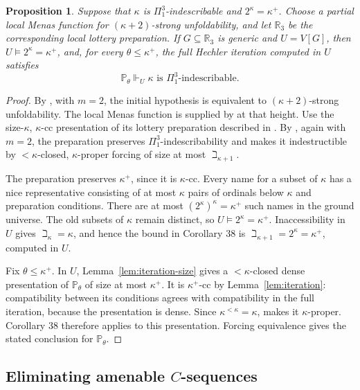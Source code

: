 \documentclass[11pt,a4paper]{amsart}
\newtheorem{proposition}[theorem]{Proposition}
\theoremstyle{definition}
\theoremstyle{remark}
\newcommand{\PP}{\mathbb P}
\newcommand{\RR}{\mathbb R}
\begin{document}
\begin{proposition}
\label{prop:pi3-preparation}
Suppose that \(\kappa\) is \(\Pi^3_1\)-indescribable and
\(2^\kappa=\kappa^+\). Choose a partial local Menas function
for \((\kappa+2)\)-strong unfoldability, and let
\(\RR_3\) be the corresponding local lottery preparation.
If \(G\subseteq\RR_3\) is generic and \(U=V[G]\), then
\(U\models2^\kappa=\kappa^+\), and, for every
\(\theta\leq\kappa^+\), the full Hechler iteration
computed in \(U\) satisfies
\[
 \PP_\theta\Vdash_U
       \text{\(\kappa\) is \(\Pi^3_1\)-indescribable}.
\]
\end{proposition}
\begin{proof}
By \cite[Corollary 35]{Johnstone}, with \(m=2\), the
initial hypothesis is equivalent to
\((\kappa+2)\)-strong unfoldability. The local Menas
function is supplied by \cite[Theorem 10(2)]{Johnstone}
at that height. Use the size-\(\kappa\), \(\kappa\)-cc
presentation of its lottery preparation described in
\cite[pp.~1229--1230]{Johnstone}.
By \cite[Corollary 38]{Johnstone}, again with \(m=2\), the preparation
preserves \(\Pi^3_1\)-indescribability and makes it
indestructible by \(<\kappa\)-closed,
\(\kappa\)-proper forcing of size at most
\(\beth_{\kappa+1}\).

The preparation preserves \(\kappa^+\), since it is
\(\kappa\)-cc. Every name for a subset of \(\kappa\)
has a nice representative consisting of at most
\(\kappa\) pairs of ordinals below \(\kappa\) and
preparation conditions. There are at most
\((2^\kappa)^\kappa=\kappa^+\) such names in the
ground universe. The old subsets of \(\kappa\) remain
distinct, so \(U\models2^\kappa=\kappa^+\).
Inaccessibility in \(U\) gives \(\beth_\kappa=\kappa\),
and hence the bound in Corollary 38 is
\(\beth_{\kappa+1}=2^\kappa=\kappa^+\), computed in
\(U\).

Fix \(\theta\leq\kappa^+\). In \(U\),
Lemma~\ref{lem:iteration-size} gives a
\(<\kappa\)-closed dense presentation of
\(\PP_\theta\) of size at most \(\kappa^+\).
It is \(\kappa^+\)-cc by Lemma~\ref{lem:iteration}:
compatibility between its conditions agrees with
compatibility in the full iteration, because the
presentation is dense. Since
\(\kappa^{<\kappa}=\kappa\),
\cite[Fact 13(4)]{Johnstone} makes it
\(\kappa\)-proper. Corollary 38 therefore applies
to this presentation. Forcing equivalence gives the
stated conclusion for \(\PP_\theta\).
\end{proof}

\subsection{Eliminating amenable \texorpdfstring{\(C\)}{C}-sequences}
\end{document}
